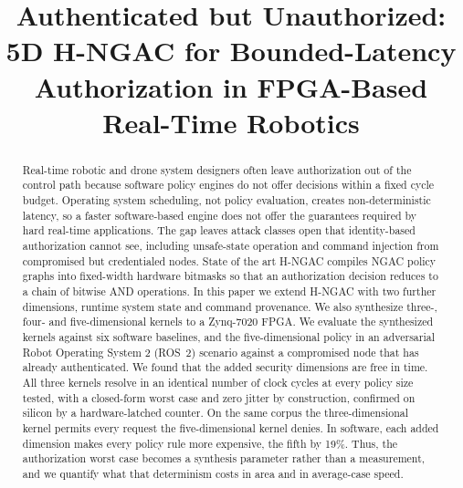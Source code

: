 \documentclass[conference]{IEEEtran}
\newcommand{\new}[1]{\textcolor{hkred}{#1}}
\begin{document}
\title{Authenticated but Unauthorized: 5D H-NGAC for Bounded-Latency Authorization in FPGA-Based Real-Time Robotics}

\author{
}

\maketitle

\begin{abstract}
Real-time robotic and drone system designers often leave authorization out of the control path because software policy engines do not offer decisions within a fixed cycle budget. Operating system scheduling, not policy evaluation, creates non-deterministic latency, so a faster software-based engine does not offer the guarantees required by hard real-time applications. The gap leaves attack classes open that identity-based authorization cannot see, including unsafe-state operation and command injection from compromised but credentialed nodes. State of the art H-NGAC compiles NGAC policy graphs into fixed-width hardware bitmasks so that an authorization decision reduces to a chain of bitwise AND operations. In this paper we extend H-NGAC with two further dimensions, runtime system state and command provenance. We also synthesize \new{three-, four- and five-dimensional} kernels to a Zynq-7020 FPGA. We evaluate the synthesized kernels against six software baselines, and the five-dimensional policy in an adversarial Robot Operating System 2 (ROS~2) scenario against a compromised node that has already authenticated. We found that the added security \new{dimensions are} free in time. \new{All three kernels} resolve in an identical number of clock cycles at every policy size tested, with a closed-form worst case and zero jitter by construction\new{, confirmed on silicon by a hardware-latched counter}. \new{On the same corpus the three-dimensional kernel permits every request the five-dimensional kernel denies.} In software, \new{each added dimension makes every policy rule more expensive, the fifth by 19\%}. Thus, the authorization worst case becomes a synthesis parameter rather than a measurement, and we quantify what that determinism costs in area and in average-case speed.
\end{abstract}
\end{document}
